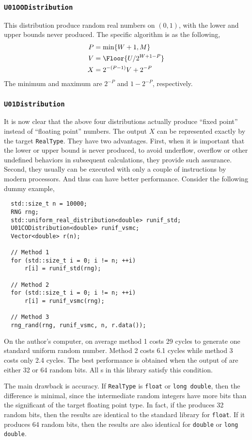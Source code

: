\subsubsection{\texttt{U01OODistribution}}

This distribution produce random real numbers on $(0, 1)$, with the lower and
upper bounds never produced. The specific algorithm is as the following,
\begin{align*}
  P &= \min\{W + 1, M\} \\
  V &= \Floor{U / 2^{W + 1 - P}} \\
  X &= 2^{-(P - 1)} V + 2^{-P}
\end{align*}
The minimum and maximum are $2^{-P}$ and $1 - 2^{-P}$, respectively.

\subsubsection{\texttt{U01Distribution}}

It is now clear that the above four distributions actually produce ``fixed
point'' instead of ``floating point'' numbers. The output $X$ can be
represented exactly by the target \verb|RealType|. They have two advantages.
First, when it is important that the lower or upper bound is never produced, to
avoid underflow, overflow or other undefined behaviors in subsequent
calculations, they provide such assurance. Second, they usually can be executed
with only a couple of instructions by modern processors. And thus can have
better performance. Consider the following dummy example,
\begin{Verbatim}
  std::size_t n = 10000;
  RNG rng;
  std::uniform_real_distribution<double> runif_std;
  U01CODistribution<double> runif_vsmc;
  Vector<double> r(n);

  // Method 1
  for (std::size_t i = 0; i != n; ++i)
      r[i] = runif_std(rng);

  // Method 2
  for (std::size_t i = 0; i != n; ++i)
      r[i] = runif_vsmc(rng);

  // Method 3
  rng_rand(rng, runif_vsmc, n, r.data());
\end{Verbatim}
On the author's computer, on average method 1 costs 29 cycles to generate one
standard uniform random number. Method 2 costs 6.1 cycles while method 3 costs
only 2.4 cycles. The best performance is obtained when the output of \rng are
either 32 or 64 random bits. All \rng{}s in this library satisfy this
condition.

The main drawback is accuracy. If \verb|RealType| is \verb|float| or
\verb|long double|, then the difference is minimal, since the intermediate
random integers have more bits than the significant of the target floating
point type. In fact, if the \rng produces 32 random bits, then the results are
identical to the standard library for \verb|float|. If it produces 64 random
bits, then the results are also identical for \verb|double| or
\verb|long double|.

